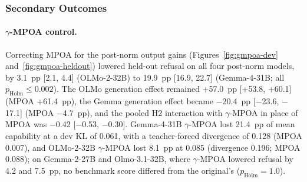 \subsubsection*{Secondary Outcomes}

\paragraph{$\gamma$-MPOA control.} Correcting MPOA for the post-norm output
gains (Figures~\ref{fig:gmpoa-dev} and~\ref{fig:gmpoa-heldout}) lowered
held-out refusal on all four post-norm models, by 3.1~pp [2.1, 4.4]
(OLMo-2-32B) to 19.9~pp [16.9, 22.7] (Gemma-4-31B; all $p_\mathrm{Holm}\le
0.002$). The OLMo generation effect remained +57.0~pp [+53.8, +60.1] (MPOA
+61.4~pp), the Gemma generation effect became $-$20.4~pp [$-$23.6, $-$17.1]
(MPOA $-$4.7~pp), and the pooled H2 interaction with $\gamma$-MPOA in place of
MPOA was $-$0.42 [$-$0.53, $-$0.30]. Gemma-4-31B $\gamma$-MPOA lost 21.4~pp of
mean capability at a dev KL of 0.061, with a teacher-forced divergence of
0.128 (MPOA 0.007), and OLMo-2-32B $\gamma$-MPOA lost 8.1~pp at 0.085
(divergence 0.196; MPOA 0.088); on Gemma-2-27B and Olmo-3.1-32B, where
$\gamma$-MPOA lowered refusal by 4.2 and 7.5~pp, no benchmark score differed
from the original's ($p_\mathrm{Holm}=1.0$).

